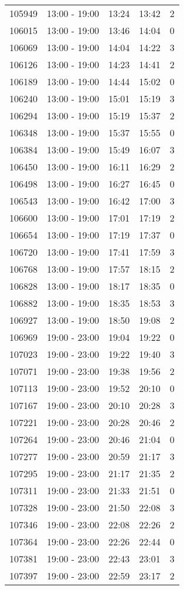\documentclass{article}
\begin{document}
\begin{tabular}{llccc}
105949 & 13:00 - 19:00 & 13:24 & 13:42 & 2 \\
106015 & 13:00 - 19:00 & 13:46 & 14:04 & 0 \\
106069 & 13:00 - 19:00 & 14:04 & 14:22 & 3 \\
106126 & 13:00 - 19:00 & 14:23 & 14:41 & 2 \\
106189 & 13:00 - 19:00 & 14:44 & 15:02 & 0 \\
106240 & 13:00 - 19:00 & 15:01 & 15:19 & 3 \\
106294 & 13:00 - 19:00 & 15:19 & 15:37 & 2 \\
106348 & 13:00 - 19:00 & 15:37 & 15:55 & 0 \\
106384 & 13:00 - 19:00 & 15:49 & 16:07 & 3 \\
106450 & 13:00 - 19:00 & 16:11 & 16:29 & 2 \\
106498 & 13:00 - 19:00 & 16:27 & 16:45 & 0 \\
106543 & 13:00 - 19:00 & 16:42 & 17:00 & 3 \\
106600 & 13:00 - 19:00 & 17:01 & 17:19 & 2 \\
106654 & 13:00 - 19:00 & 17:19 & 17:37 & 0 \\
106720 & 13:00 - 19:00 & 17:41 & 17:59 & 3 \\
106768 & 13:00 - 19:00 & 17:57 & 18:15 & 2 \\
106828 & 13:00 - 19:00 & 18:17 & 18:35 & 0 \\
106882 & 13:00 - 19:00 & 18:35 & 18:53 & 3 \\
106927 & 13:00 - 19:00 & 18:50 & 19:08 & 2 \\
106969 & 19:00 - 23:00 & 19:04 & 19:22 & 0 \\
107023 & 19:00 - 23:00 & 19:22 & 19:40 & 3 \\
107071 & 19:00 - 23:00 & 19:38 & 19:56 & 2 \\
107113 & 19:00 - 23:00 & 19:52 & 20:10 & 0 \\
107167 & 19:00 - 23:00 & 20:10 & 20:28 & 3 \\
107221 & 19:00 - 23:00 & 20:28 & 20:46 & 2 \\
107264 & 19:00 - 23:00 & 20:46 & 21:04 & 0 \\
107277 & 19:00 - 23:00 & 20:59 & 21:17 & 3 \\
107295 & 19:00 - 23:00 & 21:17 & 21:35 & 2 \\
107311 & 19:00 - 23:00 & 21:33 & 21:51 & 0 \\
107328 & 19:00 - 23:00 & 21:50 & 22:08 & 3 \\
107346 & 19:00 - 23:00 & 22:08 & 22:26 & 2 \\
107364 & 19:00 - 23:00 & 22:26 & 22:44 & 0 \\
107381 & 19:00 - 23:00 & 22:43 & 23:01 & 3 \\
107397 & 19:00 - 23:00 & 22:59 & 23:17 & 2 \\
\bottomrule
\end{tabular}
\end{document}
